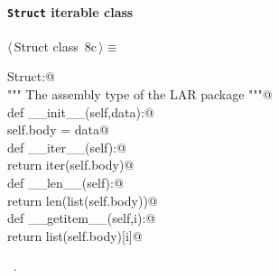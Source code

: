 \documentclass[11pt,oneside]{article}	%
\begin{document}
\paragraph{\texttt{Struct} iterable class}
\begin{flushleft} \small \label{scrap24}
\protect{}$\langle\,$Struct class\nobreak\ {\footnotesize 8c}$\,\rangle\equiv$
\vspace{-1ex}
\begin{list}{}{} \item
\mbox{}\verb@class Struct:@\\
\mbox{}\verb@    """ The assembly type of the LAR package """@\\
\mbox{}\verb@    def __init__(self,data):@\\
\mbox{}\verb@        self.body = data@\\
\mbox{}\verb@    def __iter__(self):@\\
\mbox{}\verb@        return iter(self.body)@\\
\mbox{}\verb@    def __len__(self):@\\
\mbox{}\verb@        return len(list(self.body))@\\
\mbox{}\verb@    def __getitem__(self,i):@\\
\mbox{}\verb@        return list(self.body)[i]@\\
\mbox{}\verb@@{\NWsep}
\end{list}
\vspace{-1ex}
\footnotesize\addtolength{\baselineskip}{-1ex}
\begin{list}{}{\setlength{\itemsep}{-\parsep}\setlength{\itemindent}{-\leftmargin}}
\item \NWtxtMacroRefIn\ .
\end{list}
\end{flushleft}
\end{document}
